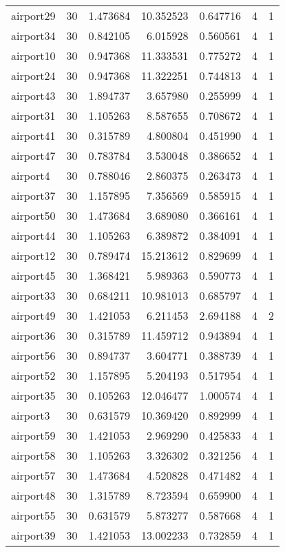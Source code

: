 \documentclass[../../../thesis.tex]{subfiles}
\begin{document}
\begin{longtable}{|l|r|r|r|r|r|r|}
airport29 & 30 & 1.473684 & 10.352523 & 0.647716 & 4 & 1 \\
airport34 & 30 & 0.842105 & 6.015928 & 0.560561 & 4 & 1 \\
airport10 & 30 & 0.947368 & 11.333531 & 0.775272 & 4 & 1 \\
airport24 & 30 & 0.947368 & 11.322251 & 0.744813 & 4 & 1 \\
airport43 & 30 & 1.894737 & 3.657980 & 0.255999 & 4 & 1 \\
airport31 & 30 & 1.105263 & 8.587655 & 0.708672 & 4 & 1 \\
airport41 & 30 & 0.315789 & 4.800804 & 0.451990 & 4 & 1 \\
airport47 & 30 & 0.783784 & 3.530048 & 0.386652 & 4 & 1 \\
airport4 & 30 & 0.788046 & 2.860375 & 0.263473 & 4 & 1 \\
airport37 & 30 & 1.157895 & 7.356569 & 0.585915 & 4 & 1 \\
airport50 & 30 & 1.473684 & 3.689080 & 0.366161 & 4 & 1 \\
airport44 & 30 & 1.105263 & 6.389872 & 0.384091 & 4 & 1 \\
airport12 & 30 & 0.789474 & 15.213612 & 0.829699 & 4 & 1 \\
airport45 & 30 & 1.368421 & 5.989363 & 0.590773 & 4 & 1 \\
airport33 & 30 & 0.684211 & 10.981013 & 0.685797 & 4 & 1 \\
airport49 & 30 & 1.421053 & 6.211453 & 2.694188 & 4 & 2 \\
airport36 & 30 & 0.315789 & 11.459712 & 0.943894 & 4 & 1 \\
airport56 & 30 & 0.894737 & 3.604771 & 0.388739 & 4 & 1 \\
airport52 & 30 & 1.157895 & 5.204193 & 0.517954 & 4 & 1 \\
airport35 & 30 & 0.105263 & 12.046477 & 1.000574 & 4 & 1 \\
airport3 & 30 & 0.631579 & 10.369420 & 0.892999 & 4 & 1 \\
airport59 & 30 & 1.421053 & 2.969290 & 0.425833 & 4 & 1 \\
airport58 & 30 & 1.105263 & 3.326302 & 0.321256 & 4 & 1 \\
airport57 & 30 & 1.473684 & 4.520828 & 0.471482 & 4 & 1 \\
airport48 & 30 & 1.315789 & 8.723594 & 0.659900 & 4 & 1 \\
airport55 & 30 & 0.631579 & 5.873277 & 0.587668 & 4 & 1 \\
airport39 & 30 & 1.421053 & 13.002233 & 0.732859 & 4 & 1 \\

\end{longtable}
\end{document}
